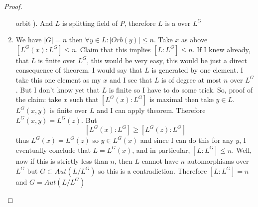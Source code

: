 \begin{theorem}[Artin]
\begin{proof}
\begin{enumerate}
      orbit ). And $L$ is splitting field of $P$, therefore $L$ is a
       over $L^G$ 
    \item We have $\left|G\right| = n$ then
      $\forall y \in L: \left|Orb\left(y\right)\right| \le n$. Take
      $x$ as above
      $\left[L^G\left(x\right): L^G\right] \le n$. Claim that this
      implies $\left[L:L^G\right] \le n$. If I knew already, that $L$ is
      finite over $L^G$, this would be very easy, this would be just a
      direct consequence of  theorem. I
      would say that $L$ is generated by one element. I take this one element as
      my $x$ and I see that $L$ is of degree at most $n$ over $L^G$. But I
      don't know yet that $L$ is finite so I have to do some trick. So,
      proof of the claim:  take $x$ such that
      $\left[L^G\left(x\right):L^G\right]$ is maximal then take $y \in
      L$. $L^G\left(x,y\right)$ is finite over $L$ and I can apply
       theorem. Therefore
      $L^G\left(x,y\right) = L^G\left(z\right)$. But
      \[
      \left[L^G\left(x\right):L^G\right] \ge
      \left[L^G\left(z\right):L^G\right]
      \]
      thus $L^G\left(x\right) = L^G\left(z\right)$ so
      $y \in L^G\left(x\right)$ and since I can do this for any $y$, I
      eventually conclude that $L = L^G\left(x\right)$, and in
      particular, $\left[L: L^G\right] \le n$. Well, now if this is
      strictly less than $n$, then $L$ cannot have $n$ automorphisms
      over $L^G$ but $G \subset Aut\left(L/L^G\right)$ so this is a
      contradiction. Therefore $\left[L: L^G\right] = n$ and
      $G = Aut\left(L/L^G\right)$
    \end{enumerate}
  \end{proof}
  \label{thm:artin}
\end{theorem}
